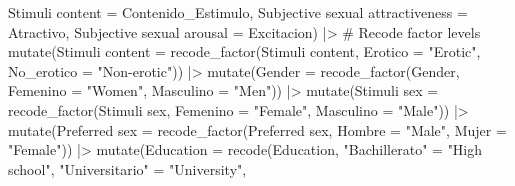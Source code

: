 \documentclass[
  bookmarksnumbered]{article}
\newenvironment{Shaded}{\begin{snugshade}}{\end{snugshade}}
\newcommand{\AttributeTok}[1]{\textcolor[rgb]{0.80,0.80,0.80}{#1}}
\newcommand{\CommentTok}[1]{\textcolor[rgb]{0.50,0.62,0.50}{#1}}
\newcommand{\FunctionTok}[1]{\textcolor[rgb]{0.94,0.94,0.56}{#1}}
\newcommand{\NormalTok}[1]{\textcolor[rgb]{0.80,0.80,0.80}{#1}}
\newcommand{\OtherTok}[1]{\textcolor[rgb]{0.94,0.94,0.56}{#1}}
\newcommand{\SpecialCharTok}[1]{\textcolor[rgb]{0.86,0.64,0.64}{#1}}
\newcommand{\StringTok}[1]{\textcolor[rgb]{0.80,0.58,0.58}{#1}}
\begin{document}
\begin{Shaded}
\begin{Highlighting}[]
         \StringTok{\textasciigrave{}}\AttributeTok{Stimuli content}\StringTok{\textasciigrave{}} \OtherTok{=}\NormalTok{ Contenido\_Estimulo,}
         \StringTok{\textasciigrave{}}\AttributeTok{Subjective sexual attractiveness}\StringTok{\textasciigrave{}} \OtherTok{=}\NormalTok{ Atractivo,}
         \StringTok{\textasciigrave{}}\AttributeTok{Subjective sexual arousal}\StringTok{\textasciigrave{}} \OtherTok{=}\NormalTok{ Excitacion) }\SpecialCharTok{|\textgreater{}}
  \CommentTok{\# Recode factor levels}
  \FunctionTok{mutate}\NormalTok{(}\StringTok{\textasciigrave{}}\AttributeTok{Stimuli content}\StringTok{\textasciigrave{}} \OtherTok{=} \FunctionTok{recode\_factor}\NormalTok{(}\StringTok{\textasciigrave{}}\AttributeTok{Stimuli content}\StringTok{\textasciigrave{}}\NormalTok{, }
                                            \AttributeTok{Erotico =} \StringTok{"Erotic"}\NormalTok{, }
                                            \AttributeTok{No\_erotico =} \StringTok{"Non{-}erotic"}\NormalTok{)) }\SpecialCharTok{|\textgreater{}} 
  \FunctionTok{mutate}\NormalTok{(}\AttributeTok{Gender =} \FunctionTok{recode\_factor}\NormalTok{(Gender, }
                                \AttributeTok{Femenino =} \StringTok{"Women"}\NormalTok{, }
                                \AttributeTok{Masculino =} \StringTok{"Men"}\NormalTok{)) }\SpecialCharTok{|\textgreater{}}
  \FunctionTok{mutate}\NormalTok{(}\StringTok{\textasciigrave{}}\AttributeTok{Stimuli sex}\StringTok{\textasciigrave{}} \OtherTok{=} \FunctionTok{recode\_factor}\NormalTok{(}\StringTok{\textasciigrave{}}\AttributeTok{Stimuli sex}\StringTok{\textasciigrave{}}\NormalTok{,}
                                       \AttributeTok{Femenino =} \StringTok{"Female"}\NormalTok{, }
                                       \AttributeTok{Masculino =} \StringTok{"Male"}\NormalTok{)) }\SpecialCharTok{|\textgreater{}}
  \FunctionTok{mutate}\NormalTok{(}\StringTok{\textasciigrave{}}\AttributeTok{Preferred sex}\StringTok{\textasciigrave{}} \OtherTok{=} \FunctionTok{recode\_factor}\NormalTok{(}\StringTok{\textasciigrave{}}\AttributeTok{Preferred sex}\StringTok{\textasciigrave{}}\NormalTok{,}
                                         \AttributeTok{Hombre =} \StringTok{"Male"}\NormalTok{, }
                                         \AttributeTok{Mujer =} \StringTok{"Female"}\NormalTok{)) }\SpecialCharTok{|\textgreater{}}
  \FunctionTok{mutate}\NormalTok{(}\AttributeTok{Education =} \FunctionTok{recode}\NormalTok{(Education,}
                            \StringTok{"Bachillerato"} \OtherTok{=} \StringTok{"High school"}\NormalTok{,}
                            \StringTok{"Universitario"} \OtherTok{=} \StringTok{"University"}\NormalTok{,}

\end{Highlighting}
\end{Shaded}
\end{document}
